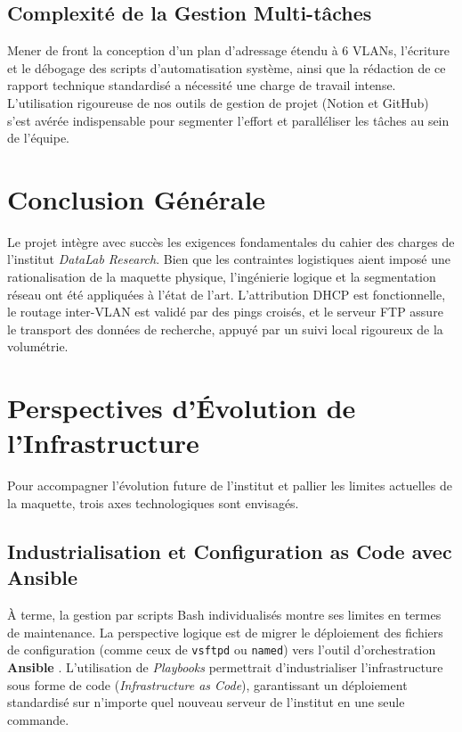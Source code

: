 \subsection{Complexité de la Gestion Multi-tâches}
Mener de front la conception d'un plan d'adressage étendu à 6 VLANs, l'écriture et le débogage des scripts d'automatisation système, ainsi que la rédaction de ce rapport technique standardisé a nécessité une charge de travail intense. L'utilisation rigoureuse de nos outils de gestion de projet (Notion et GitHub) s'est avérée indispensable pour segmenter l'effort et paralléliser les tâches au sein de l'équipe.

\section{Conclusion Générale}
Le projet intègre avec succès les exigences fondamentales du cahier des charges de l'institut \textit{DataLab Research}. Bien que les contraintes logistiques aient imposé une rationalisation de la maquette physique, l'ingénierie logique et la segmentation réseau ont été appliquées à l'état de l'art. L'attribution DHCP est fonctionnelle, le routage inter-VLAN est validé par des pings croisés, et le serveur FTP assure le transport  des données de recherche, appuyé par un suivi local rigoureux de la volumétrie.

\section{Perspectives d'Évolution de l'Infrastructure}
Pour accompagner l'évolution future de l'institut et pallier les limites actuelles de la maquette, trois axes technologiques sont envisagés.

\subsection{Industrialisation et Configuration as Code avec Ansible}
À terme, la gestion par scripts Bash individualisés montre ses limites en termes de maintenance. La perspective logique est de migrer le déploiement des fichiers de configuration (comme ceux de \texttt{vsftpd} ou \texttt{named}) vers l'outil d'orchestration \textbf{Ansible} \cite{ansible_doc}. L'utilisation de \textit{Playbooks} permettrait d'industrialiser l'infrastructure sous forme de code (\textit{Infrastructure as Code}), garantissant un déploiement standardisé sur n'importe quel nouveau serveur de l'institut en une seule commande.

